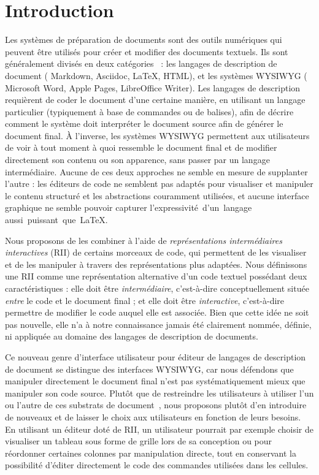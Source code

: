 \section{Introduction}
\label{sec:introduction}%

Les systèmes de préparation de documents sont des outils numériques qui peuvent être utilisés pour créer et modifier des documents textuels.
Ils sont généralement divisés en deux catégories~\cite{johnson1988styles} : les langages de description de document (\eg{} Markdown, Asciidoc, \LaTeX{}, HTML), et les systèmes WYSIWYG (\eg{} Microsoft Word, Apple Pages, LibreOffice Writer).
Les langages de description requièrent de coder le document d'une certaine manière, en utilisant un langage particulier (typiquement à base de commandes ou de balises), afin de décrire comment le système doit interpréter le document source afin de générer le document final.
À l'inverse, les systèmes WYSIWYG permettent aux utilisateurs de voir à tout moment à quoi ressemble le document final et de modifier directement son contenu ou son apparence, sans passer par un langage intermédiaire.
Aucune de ces deux approches ne semble en mesure de supplanter l’autre :
les éditeurs de code ne semblent pas adaptés pour visualiser et manipuler le contenu structuré et les abstractions couramment utilisées, et aucune interface graphique ne semble pouvoir capturer l'expressivité~d'un~langage aussi~puissant~que~\LaTeX{}.

Nous proposons de les combiner à l'aide de \emph{représentations intermédiaires interactives} (RII) de certains morceaux de code, qui permettent de les visualiser et de les manipuler à travers des représentations plus adaptées.
Nous définissons une RII comme une représentation alternative d'un code textuel possédant deux caractéristiques :
elle doit être \emph{intermédiaire}, c'est-à-dire conceptuellement située \emph{entre} le code et le document final ;
et elle doit être \emph{interactive}, c'est-à-dire permettre de modifier le code auquel elle est associée.
Bien que cette idée ne soit pas nouvelle, elle n'a à notre connaissance jamais été clairement nommée, définie, ni appliquée au domaine des langages de description de documents.

Ce nouveau genre d'interface utilisateur pour éditeur de langages de description de document se distingue des interfaces WYSIWYG, car nous défendons que manipuler directement le document final n'est pas systématiquement mieux que manipuler son code source.
Plutôt que de restreindre les utilisateurs à utiliser l'un ou l'autre de ces substrats de document~\cite{beaudouinlafon2017towards}, nous proposons plutôt d'en introduire de nouveaux et de laisser le choix aux utilisateurs en fonction de leurs besoins.
En utilisant un éditeur doté de RII, un utilisateur pourrait par exemple choisir de visualiser un tableau sous forme de grille lors de sa conception ou pour réordonner certaines colonnes par manipulation directe, tout en conservant la possibilité d'éditer directement le code des commandes utilisées dans les cellules.

